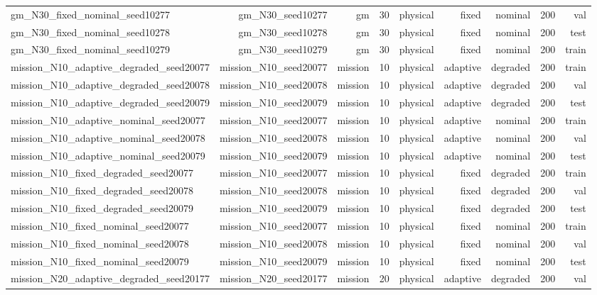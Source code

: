 \begin{tabular}{lrrrrrrrr}
gm\_N30\_fixed\_nominal\_seed10277 & gm\_N30\_seed10277 & gm & 30 & physical & fixed & nominal & 200 & val \\
gm\_N30\_fixed\_nominal\_seed10278 & gm\_N30\_seed10278 & gm & 30 & physical & fixed & nominal & 200 & test \\
gm\_N30\_fixed\_nominal\_seed10279 & gm\_N30\_seed10279 & gm & 30 & physical & fixed & nominal & 200 & train \\
mission\_N10\_adaptive\_degraded\_seed20077 & mission\_N10\_seed20077 & mission & 10 & physical & adaptive & degraded & 200 & train \\
mission\_N10\_adaptive\_degraded\_seed20078 & mission\_N10\_seed20078 & mission & 10 & physical & adaptive & degraded & 200 & val \\
mission\_N10\_adaptive\_degraded\_seed20079 & mission\_N10\_seed20079 & mission & 10 & physical & adaptive & degraded & 200 & test \\
mission\_N10\_adaptive\_nominal\_seed20077 & mission\_N10\_seed20077 & mission & 10 & physical & adaptive & nominal & 200 & train \\
mission\_N10\_adaptive\_nominal\_seed20078 & mission\_N10\_seed20078 & mission & 10 & physical & adaptive & nominal & 200 & val \\
mission\_N10\_adaptive\_nominal\_seed20079 & mission\_N10\_seed20079 & mission & 10 & physical & adaptive & nominal & 200 & test \\
mission\_N10\_fixed\_degraded\_seed20077 & mission\_N10\_seed20077 & mission & 10 & physical & fixed & degraded & 200 & train \\
mission\_N10\_fixed\_degraded\_seed20078 & mission\_N10\_seed20078 & mission & 10 & physical & fixed & degraded & 200 & val \\
mission\_N10\_fixed\_degraded\_seed20079 & mission\_N10\_seed20079 & mission & 10 & physical & fixed & degraded & 200 & test \\
mission\_N10\_fixed\_nominal\_seed20077 & mission\_N10\_seed20077 & mission & 10 & physical & fixed & nominal & 200 & train \\
mission\_N10\_fixed\_nominal\_seed20078 & mission\_N10\_seed20078 & mission & 10 & physical & fixed & nominal & 200 & val \\
mission\_N10\_fixed\_nominal\_seed20079 & mission\_N10\_seed20079 & mission & 10 & physical & fixed & nominal & 200 & test \\
mission\_N20\_adaptive\_degraded\_seed20177 & mission\_N20\_seed20177 & mission & 20 & physical & adaptive & degraded & 200 & val \\

\end{tabular}
